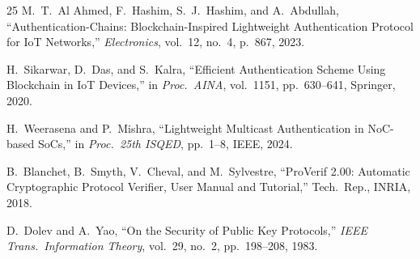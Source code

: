 \documentclass[conference]{IEEEtran}
\begin{document}
\begin{thebibliography}{25}
M.~T.~Al Ahmed, F.~Hashim, S.~J.~Hashim, and A.~Abdullah,
``Authentication-Chains: Blockchain-Inspired Lightweight Authentication
Protocol for IoT Networks,''
\emph{Electronics}, vol.~12, no.~4, p.~867, 2023.

H.~Sikarwar, D.~Das, and S.~Kalra,
``Efficient Authentication Scheme Using Blockchain in IoT Devices,''
in \emph{Proc.\ AINA}, vol.~1151, pp.~630--641, Springer, 2020.


H.~Weerasena and P.~Mishra,
``Lightweight Multicast Authentication in NoC-based SoCs,''
in \emph{Proc.\ 25th ISQED}, pp.~1--8, IEEE, 2024.

B.~Blanchet, B.~Smyth, V.~Cheval, and M.~Sylvestre,
``ProVerif 2.00: Automatic Cryptographic Protocol Verifier, User Manual and
Tutorial,''
Tech.\ Rep., INRIA, 2018.

D.~Dolev and A.~Yao,
``On the Security of Public Key Protocols,''
\emph{IEEE Trans.\ Information Theory}, vol.~29, no.~2, pp.~198--208, 1983.

\end{thebibliography}
\fi
\end{document}
